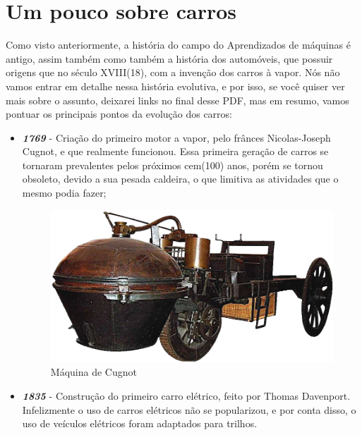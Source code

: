 \documentclass[12pt]{article}
\begin{document}
    \section {Um pouco sobre carros} \label{sec:carros}

        Como visto anteriormente, a história do campo do Aprendizados de máquinas é antigo, assim também como também a história 
        dos automóveis, que possuir origens que no século XVIII(18), com a invenção dos carros à vapor. Nós não vamos entrar em 
        detalhe nessa história evolutiva, e por isso, se você quiser ver mais sobre o assunto, deixarei links no final desse PDF, 
        mas em resumo, vamos pontuar os principais pontos da evolução dos carros:

        \begin{itemize}

            \item \textbf{\emph{1769}} - Criação do primeiro motor a vapor, pelo frânces Nicolas-Joseph Cugnot, e que realmente funcionou. Essa primeira geração de carros
            se tornaram prevalentes pelos próximos cem(100) anos, porém se tornou obsoleto, devido a sua pesada caldeira, o que limitiva 
            as atividades que o mesmo podia fazer;

            \begin{figure}[htp]

                \centering
                \includegraphics[scale=0.5]{vapor.png}
                \caption{\centering Máquina de Cugnot}

            \end{figure}

            \item \textbf{\emph{1835}} - Construção do primeiro carro elétrico, feito por Thomas Davenport. Infelizmente o uso de carros elétricos 
            não se popularizou, e por conta disso, o uso de veículos elétricos foram adaptados para trilhos.


\end{itemize}
\end{document}
